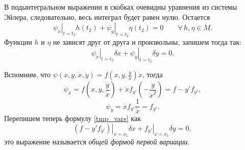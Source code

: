 \documentclass[12pt,a5paper]{book}
\begin{document}
	В подынтегральном выражении в скобках очевидны уравнения из системы Эйлера, следовательно, весь интеграл будет равен нулю. Остается
	\begin{equation*}
		\left.\psi_{\dot{x}}\right|_{t=t_2}h(t_2) + \left.\psi_{\dot{y}}\right|_{t=t_2}\eta(t_2) = 0 \qquad \forall\,h,\eta \in M.
	\end{equation*}
	Функции $h$ и $\eta$ не зависят друг от друга и произвольны, запишем тогда так:
	\begin{equation}\label{tmp_vars}
		\left.\psi_{\dot{x}}\right|_{t=t_2}\delta x + \left.\psi_{\dot{y}}\right|_{t=t_2}\delta y = 0.
	\end{equation}
	
	Вспомним, что $\psi(x, y, \dot{x}, \dot{y}) = f(x, y, \frac{\dot{y}}{\dot{x}})\dot{x}$, тогда
	\begin{equation*}
		\psi_{\dot{x}} = f\left(x, y, \frac{\dot{y}}{\dot{x}}\right) + \dot{x}f_{y'}\left(-\frac{\dot{y}}{\dot{x}^2}\right) = f - y'f_{y'},
	\end{equation*}
	\begin{equation*}
		\psi_{\dot{y}} = \dot{x}f_{y'}\frac{1}{\dot{x}} = f_{y'}.
	\end{equation*}
	Перепишем теперь формулу \eqref{tmp_vars} как
	\begin{equation}\label{1st_var_common}
		\left.\left(f - y'f_{y'}\right)\right|_{x=x_1}\delta x + \left.f_{y'}\right|_{x=x_1}\delta y = 0,
	\end{equation}
	это выражение называется \emph{общей формой первой вариации}.
	
\end{document}
